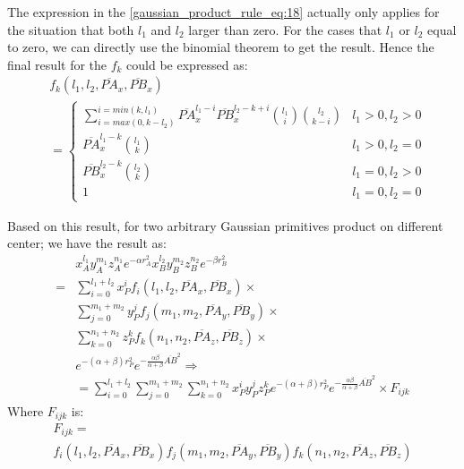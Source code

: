 The expression in the \ref{gaussian_product_rule_eq:18} actually only applies for the situation 
that both $l_{1}$ and $l_{2}$ larger than zero. For the cases that $l_{1}$ or $l_{2}$ equal to zero,
we can directly use the binomial theorem to get the result. Hence the final result for the 
$f_{k}$ could be expressed as:
\begin{align}
\label{gaussian_product_rule_eq:18}
 &f_{k}(l_{1},l_{2},\overline{PA}_{x},\overline{PB}_{x}) \nonumber \\
&=
\begin{cases}
\sum_{i=max(0,k-l_{2})}^{i=min(k,l_{1})}\overline{PA}_{x}^{l_{1}-i}
\overline{PB}_{x}^{l_{2}-k+i}\binom{l_{1}}{i}\binom{l_{2}}{k-i}
    & l_{1} > 0, l_{2} > 0 \\
\overline{PA}_{x}^{l_{1}-k}\binom{l_{1}}{k}  
&  l_{1} > 0, l_{2} = 0 \\
\overline{PB}_{x}^{l_{2}-k}\binom{l_{2}}{k}  
&  l_{1} = 0, l_{2} > 0 \\
1                                           
&  l_{1} = 0, l_{2} = 0
\end{cases}
\end{align} 

Based on this result, for two arbitrary Gaussian primitives product on different center; 
we have the result as:
\begin{align}
&  x_{A}^{l_{1}}y_{A}^{m_{1}}z_{A}^{n_{1}}e^{-\alpha r_{A}^{2}}
   x_{B}^{l_{2}}y_{B}^{m_{2}}z_{B}^{n_{2}}e^{-\beta  r_{B}^{2}} \nonumber \\
=& \sum_{i=0}^{l_{1}+l_{2}}x_{P}^{i}f_{i}(l_{1},l_{2},\overline{PA}_{x},\overline{PB}_{x})  
   \times \nonumber \\
 & \sum_{j=0}^{m_{1}+m_{2}}y_{P}^{j}f_{j}(m_{1},m_{2},\overline{PA}_{y},\overline{PB}_{y})  
   \times \nonumber \\
 & \sum_{k=0}^{n_{1}+n_{2}}z_{P}^{k}f_{k}(n_{1},n_{2},\overline{PA}_{z},\overline{PB}_{z})  
   \times \nonumber \\
 &  e^{-(\alpha+\beta)r_{P}^{2}} e^{-\frac{\alpha\beta}{\alpha+\beta}\overline{AB}^{2}}
   \Rightarrow \nonumber \\
 & =\sum_{i=0}^{l_{1}+l_{2}}\sum_{j=0}^{m_{1}+m_{2}}\sum_{k=0}^{n_{1}+n_{2}}
   x_{P}^{i}y_{P}^{j}z_{P}^{k}
   e^{-(\alpha+\beta)r_{P}^{2}} e^{-\frac{\alpha\beta}{\alpha+\beta}\overline{AB}^{2}}
   \times F_{ijk}
  \label{gaussian_product_rule_eq:19}
\end{align}
Where $F_{ijk}$ is:
\begin{multline}
  F_{ijk} = \\
            f_{i}(l_{1},l_{2},\overline{PA}_{x},\overline{PB}_{x})
            f_{j}(m_{1},m_{2},\overline{PA}_{y},\overline{PB}_{y})
            f_{k}(n_{1},n_{2},\overline{PA}_{z},\overline{PB}_{z}) 
 \label{gaussian_product_rule_eq:20}
\end{multline}

